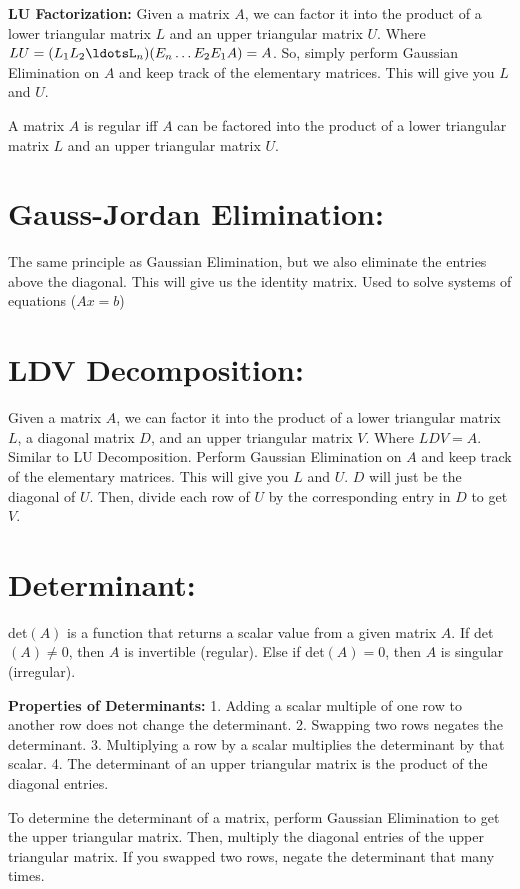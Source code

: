 \documentclass[11pt]{article}
\begin{document}
    \textbf{LU Factorization:}
    Given a matrix $A$, we can factor it into the product of a lower triangular matrix $L$ and an upper triangular matrix $U$.
    Where $LU = (L_1L_2\ldotsL_n)(E_n\ldots E_2E_1A)=A$.
    So, simply perform Gaussian Elimination on $A$ and keep track of the elementary matrices.
    This will give you $L$ and $U$.

    A matrix $A$ is regular iff $A$ can be factored into the product of a lower triangular matrix $L$ and an upper triangular matrix $U$.

    \section{Gauss-Jordan Elimination:}
    The same principle as Gaussian Elimination, but we also eliminate the entries above the diagonal.
    This will give us the identity matrix.
    Used to solve systems of equations ($Ax=b$)

    \section{LDV Decomposition:}
    Given a matrix $A$, we can factor it into the product of a lower triangular matrix $L$, a diagonal matrix $D$, and an upper triangular matrix $V$.
    Where $LDV = A$.
    Similar to LU Decomposition.
    Perform Gaussian Elimination on $A$ and keep track of the elementary matrices.
    This will give you $L$ and $U$.
    $D$ will just be the diagonal of $U$.
    Then, divide each row of $U$ by the corresponding entry in $D$ to get $V$.

    \section{Determinant:}
    det$(A)$ is a function that returns a scalar value from a given matrix $A$.
    If det$(A) \neq 0$, then $A$ is invertible (regular).
    Else if det$(A) = 0$, then $A$ is singular (irregular).

    \textbf{Properties of Determinants:}
    1.
    Adding a scalar multiple of one row to another row does not change the determinant.
    2.
    Swapping two rows negates the determinant.
    3.
    Multiplying a row by a scalar multiplies the determinant by that scalar.
    4.
    The determinant of an upper triangular matrix is the product of the diagonal entries.

    To determine the determinant of a matrix, perform Gaussian Elimination to get the upper triangular matrix.
    Then, multiply the diagonal entries of the upper triangular matrix.
    If you swapped two rows, negate the determinant that many times.
\end{document}
